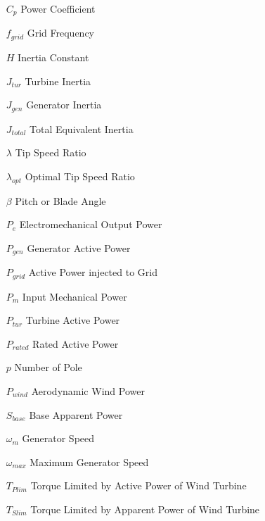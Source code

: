 
\begin{theglossary}{}
	
	\begin{itemize}[leftmargin=4.5em,align=parleft,labelsep=1cm]
		
		\item[$C_{p}$] 			Power Coefficient
		\item[$f_{grid}$] 		Grid Frequency
		\item[$H$] 				Inertia Constant
		\item[$J_{tur}$] 		Turbine Inertia
		\item[$J_{gen}$] 		Generator Inertia
		\item[$J_{total}$] 		Total Equivalent Inertia		\item[$\lambda$] 		Tip Speed Ratio
		\item[$\lambda_{opt}$]	Optimal Tip Speed Ratio
		\item[$\beta$]			Pitch or Blade Angle
		\item[$P_{e}$] 			Electromechanical Output Power
		\item[$P_{gen}$] 		Generator Active Power
		\item[$P_{grid}$] 		Active Power injected to Grid
		\item[$P_{m}$] 			Input Mechanical Power
		\item[$P_{tur}$] 		Turbine Active Power
		\item[$P_{rated}$] 		Rated Active Power		
		\item[$p$] 				Number of Pole
		\item[$P_{wind}$] 		Aerodynamic Wind Power
		\item[$S_{base}$] 		Base Apparent Power
		\item[$\omega_{m}$] 	Generator Speed
		\item[$\omega_{max}$] 	Maximum Generator Speed
		\item[$T_{Plim}$]		Torque Limited by Active Power of Wind Turbine
		\item[$T_{Slim}$] 		Torque Limited by Apparent Power of Wind Turbine
	\end{itemize}
	
\end{theglossary}